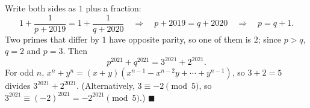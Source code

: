 Write both sides as $1$ plus a fraction:
\[
1+\dfrac{1}{p+2019}=1+\dfrac{1}{q+2020}\quad\Longrightarrow\quad p+2019=q+2020\quad\Longrightarrow\quad p=q+1 .
\]
Two primes that differ by $1$ have opposite parity, so one of them is $2$; since $p>q$, $q=2$ and $p=3$. Then
\[
p^{2021}+q^{2021}=3^{2021}+2^{2021}.
\]
For odd $n$, $x^n+y^n=(x+y)(x^{n-1}-x^{n-2}y+\cdots+y^{n-1})$, so $3+2=5$ divides $3^{2021}+2^{2021}$. (Alternatively, $3\equiv-2\pmod5$, so $3^{2021}\equiv(-2)^{2021}=-2^{2021}\pmod 5$.) $\blacksquare$
